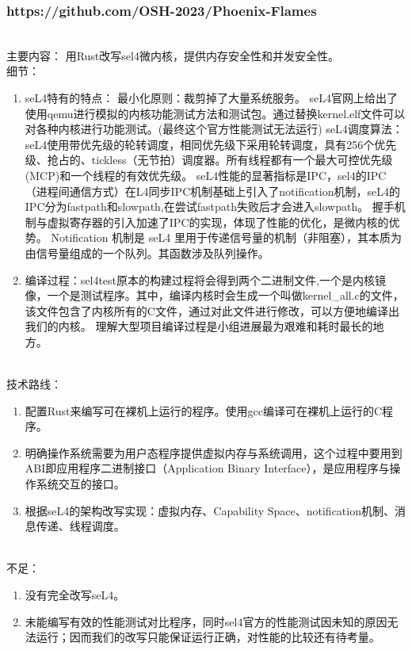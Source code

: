 \documentclass{ctexart}
\begin{document}
\subsubsection{https://github.com/OSH-2023/Phoenix-Flames}\ \\
\indent 主要内容： 用Rust改写sel4微内核，提供内存安全性和并发安全性。\\
\indent 细节：
\begin{enumerate}
\item seL4特有的特点： 最小化原则：裁剪掉了大量系统服务。 seL4官网上给出了使用qemu进行模拟的内核功能测试方法和测试包。通过替换kernel.elf文件可以对各种内核进行功能测试。(最终这个官方性能测试无法运行) seL4调度算法：seL4使⽤带优先级的轮转调度，相同优先级下采用轮转调度，具有256个优先级、抢占的、tickless（无节拍）调度器。所有线程都有⼀个最⼤可控优先级(MCP)和⼀个线程的有效优先级。 seL4性能的显著指标是IPC，sel4的IPC（进程间通信方式）在L4同步IPC机制基础上引入了notification机制，seL4的IPC分为fastpath和slowpath,在尝试fastpath失败后才会进入slowpath。 握手机制与虚拟寄存器的引入加速了IPC的实现，体现了性能的优化，是微内核的优势。 Notification 机制是 seL4 里用于传递信号量的机制（非阻塞），其本质为由信号量组成的一个队列。其函数涉及队列操作。
\item 编译过程：sel4test原本的构建过程将会得到两个二进制文件,一个是内核镜像，一个是测试程序。其中，编译内核时会生成一个叫做kernel\_all.c的文件，该文件包含了内核所有的C文件，通过对此文件进行修改，可以方便地编译出我们的内核。 理解大型项目编译过程是小组进展最为艰难和耗时最长的地方。
\end{enumerate}\ \\
\indent 技术路线：
\begin{enumerate}
\item 配置Rust来编写可在裸机上运行的程序。使用gcc编译可在裸机上运行的C程序。
\item 明确操作系统需要为用户态程序提供虚拟内存与系统调用，这个过程中要用到ABI即应用程序二进制接口（Application Binary Interface），是应用程序与操作系统交互的接口。
\item 根据seL4的架构改写实现：虚拟内存、Capability Space、notification机制、消息传递、线程调度。
\end{enumerate}\ \\
\indent 不足：
\begin{enumerate}
\item 没有完全改写seL4。
\item 未能编写有效的性能测试对比程序，同时sel4官方的性能测试因未知的原因无法运行；因而我们的改写只能保证运行正确，对性能的比较还有待考量。
\end{enumerate}
\end{document}
